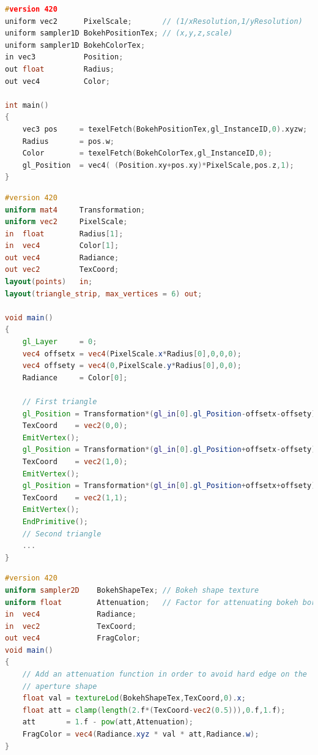 \begin{lstlisting}[language=C++,float={htb},caption={Pixel shader application for rendering bokeh \emph{(Pass 4)}.},label={DeRousiers:renderingbokehps}]
#version 420
uniform vec2      PixelScale;       // (1/xResolution,1/yResolution)
uniform sampler1D BokehPositionTex; // (x,y,z,scale)
uniform sampler1D BokehColorTex;
in vec3           Position;
out float         Radius;
out vec4          Color;

int main()
{
	vec3 pos     = texelFetch(BokehPositionTex,gl_InstanceID,0).xyzw;
	Radius       = pos.w;
	Color        = texelFetch(BokehColorTex,gl_InstanceID,0);
	gl_Position	 = vec4( (Position.xy+pos.xy)*PixelScale,pos.z,1);
}
\end{lstlisting}

\begin{lstlisting}[language=GLSL,float={htb},caption={Geometry shader for rendering bokeh \emph{(Pass 4)}.},label={DeRousiers:renderingbokehgs}]
#version 420
uniform mat4     Transformation;
uniform vec2     PixelScale;
in  float        Radius[1];
in  vec4         Color[1];
out vec4         Radiance;
out vec2         TexCoord;
layout(points)   in;
layout(triangle_strip, max_vertices = 6) out;

void main()
{
	gl_Layer     = 0;
	vec4 offsetx = vec4(PixelScale.x*Radius[0],0,0,0);
	vec4 offsety = vec4(0,PixelScale.y*Radius[0],0,0);
	Radiance     = Color[0];

	// First triangle
	gl_Position = Transformation*(gl_in[0].gl_Position-offsetx-offsety);
	TexCoord    = vec2(0,0);
	EmitVertex();
	gl_Position = Transformation*(gl_in[0].gl_Position+offsetx-offsety);
	TexCoord    = vec2(1,0);
	EmitVertex();
	gl_Position = Transformation*(gl_in[0].gl_Position+offsetx+offsety);
	TexCoord    = vec2(1,1);
	EmitVertex();
	EndPrimitive();
	// Second triangle
	...
}
\end{lstlisting}


\begin{lstlisting}[language=GLSL,float={htb},caption={Fragment shader for rendering bokeh \emph{(Pass 4)}.},label={DeRousiers:renderingbokehfs}]
#version 420
uniform sampler2D    BokehShapeTex; // Bokeh shape texture
uniform float        Attenuation;   // Factor for attenuating bokeh borders
in  vec4             Radiance;
in  vec2             TexCoord;
out vec4             FragColor;
void main()
{
	// Add an attenuation function in order to avoid hard edge on the 
	// aperture shape
	float val = textureLod(BokehShapeTex,TexCoord,0).x;
	float att = clamp(length(2.f*(TexCoord-vec2(0.5))),0.f,1.f);
	att       = 1.f - pow(att,Attenuation);
	FragColor = vec4(Radiance.xyz * val * att,Radiance.w);
}
\end{lstlisting}
















